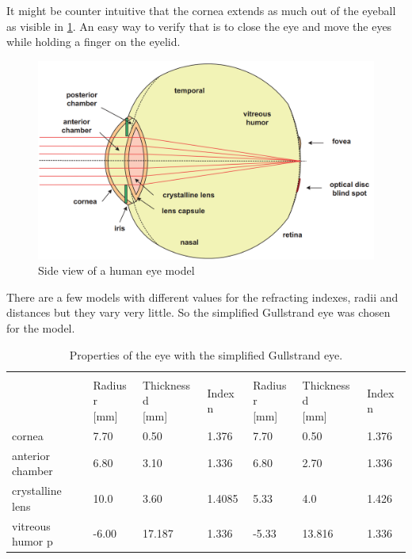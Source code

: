 It might be counter intuitive that the cornea extends as much out of the eyeball as visible in \ref{fig:humanEyeModel}. An easy way to verify that is to close the eye and move the eyes while holding a finger on the eyelid.
\label{sec:theHumanEye}
\begin{figure}[H]
	\centering
	\includegraphics[scale=0.3]{images/human_eye_model.png}
	\caption{Side view of a human eye model \cite{gross:opticalSystems}}
	\label{fig:humanEyeModel}
\end{figure}

There are a few models with different values for the refracting indexes, radii and distances but they vary very little. So the simplified Gullstrand eye was chosen for the model.

\begin{table}[!htb]
\centering
\begin{tabular}{@{}|l|l|l|l|l|l|l|@{}}
	\hline
	\multirow{2}{*}{} & \multicolumn{3}{l|}{\thead{Relaxed}} & \multicolumn{3}{l|}{\thead{Accomodated}} \\ \hhline{~------}
	\thead{ Notaton\\{}} &  \thead{Radius r \\ {}[mm] }        & \thead{Thickness d\\ {}[mm]}    & \thead{Index n\\ {}}        & \thead{Radius r \\ {}[mm] }& \thead{Thickness d \\ {}[mm] }& \thead{Index n\\{} }    \\ \hline
	cornea     &  7.70        & 0.50      & 1.376       &  7.70   &0.50  & 1.376\\ \hline
	anterior chamber & 6.80        & 3.10     & 1.336       & 6.80    & 2.70&1.336 \\ \hline
	crystalline lens     &  10.0    & 3.60          & 1.4085    & 5.33   &   4.0  &  1.426 \\ \hline
	vitreous humor    p  & -6.00      & 17.187         & 1.336    & -5.33  & 13.816  &  1.336  \\ \hline
\end{tabular}
\caption{Properties of the eye with the simplified Gullstrand eye. \cite{gross:opticalSystems}}
\label{tab:gullstrandEye}
\end{table}


